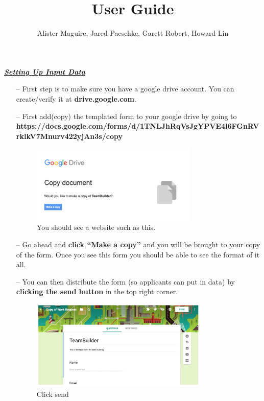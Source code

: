 \documentclass[10pt]{article}
\begin{document}
\title{User Guide}
\author{Alister Maguire, Jared Paeschke, Garett Robert, Howard Lin}

\maketitle
\LARGE
\textbf{\textit{\underline{Setting Up Input Data}}}
\normalsize
\begin{enumerate}
\item[--] First step is to make sure you have a google drive account. You can create/verify it at \textbf{drive.google.com}.
\item[--] First add(copy) the templated form to your google drive by going to \\
\textbf{https://docs.google.com/forms/d/1TNLJhRqVsJgYPVE4l6FGnRVrklkV7Mnurv422yjAn3s/copy} \\
\begin{figure}[h]
\caption{You should see a website such as this.}
\centering
\includegraphics[width=0.75\textwidth]{pic1}
\end{figure}
\item[--] Go ahead and \textbf{click “Make a copy”} and you will be brought to your copy of the form. Once you see this form you should be able to see the format of it all.
\item[--] You can then distribute the form (so applicants can put in data) by \textbf{clicking the send button} in the top right corner.
\begin{figure}[h]
\caption{Click send}
\centering
\includegraphics[width=0.8\textwidth]{pic2}

\end{figure}
\end{enumerate}
\end{document}

